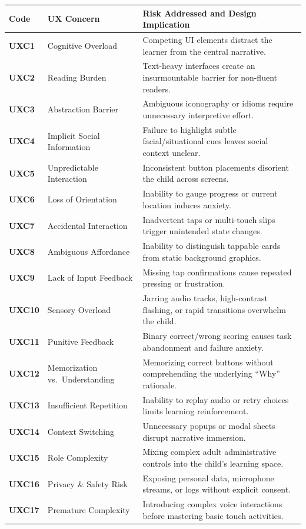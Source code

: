 \begin{xltabular}{\textwidth}{|p{1.8cm}|p{4.2cm}|X|}
\hline
\textbf{Code} & \textbf{UX Concern} & \textbf{Risk Addressed and Design Implication} \\ \hline
\endhead
\textbf{UXC1} & Cognitive Overload & Competing UI elements distract the learner from the central narrative. \\ \hline
\textbf{UXC2} & Reading Burden & Text-heavy interfaces create an insurmountable barrier for non-fluent readers. \\ \hline
\textbf{UXC3} & Abstraction Barrier & Ambiguous iconography or idioms require unnecessary interpretive effort. \\ \hline
\textbf{UXC4} & Implicit Social Information & Failure to highlight subtle facial/situational cues leaves social context unclear. \\ \hline
\textbf{UXC5} & Unpredictable Interaction & Inconsistent button placements disorient the child across screens. \\ \hline
\textbf{UXC6} & Loss of Orientation & Inability to gauge progress or current location induces anxiety. \\ \hline
\textbf{UXC7} & Accidental Interaction & Inadvertent taps or multi-touch slips trigger unintended state changes. \\ \hline
\textbf{UXC8} & Ambiguous Affordance & Inability to distinguish tappable cards from static background graphics. \\ \hline
\textbf{UXC9} & Lack of Input Feedback & Missing tap confirmations cause repeated pressing or frustration. \\ \hline
\textbf{UXC10} & Sensory Overload & Jarring audio tracks, high-contrast flashing, or rapid transitions overwhelm the child. \\ \hline
\textbf{UXC11} & Punitive Feedback & Binary correct/wrong scoring causes task abandonment and failure anxiety. \\ \hline
\textbf{UXC12} & Memorization vs.\ Understanding & Memorizing correct buttons without comprehending the underlying ``Why'' rationale. \\ \hline
\textbf{UXC13} & Insufficient Repetition & Inability to replay audio or retry choices limits learning reinforcement. \\ \hline
\textbf{UXC14} & Context Switching & Unnecessary popups or modal sheets disrupt narrative immersion. \\ \hline
\textbf{UXC15} & Role Complexity & Mixing complex adult administrative controls into the child's learning space. \\ \hline
\textbf{UXC16} & Privacy \& Safety Risk & Exposing personal data, microphone streams, or logs without explicit consent. \\ \hline
\textbf{UXC17} & Premature Complexity & Introducing complex voice interactions before mastering basic touch activities. \\ \hline
\end{xltabular}
\label{tab:c5_ux_concerns}

